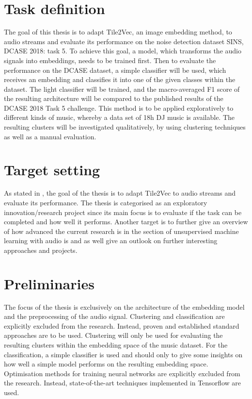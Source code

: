 \section{Task definition}
\label{sub:Task-Definition}
The goal of this thesis is to adapt Tile2Vec, an image embedding method, to audio streams and evaluate its performance on the noise detection dataset \flqq SINS, DCASE 2018: task 5\frqq. 
\newline
\newline
To achieve this goal, a model, which transforms the audio signals into embeddings, needs to be trained first. Then to evaluate the performance on the DCASE dataset, a simple classifier will be used, which receives an embedding and classifies it into one of the given classes within the dataset. The light classifier will be trained, and the macro-averaged F1 score of the resulting architecture will be compared to the published results of the DCASE 2018 Task 5 challenge.
\newline
\newline
This method is to be applied exploratively to different kinds of music, whereby a data set of 18h DJ music is available. The resulting clusters will be investigated qualitatively, by using clustering techniques as well as a manual evaluation.

\section{Target setting}
\label{sub:Target-Setting}
As stated in , the goal of the thesis is to adapt Tile2Vec to audio streams and evaluate its performance. The thesis is categorised as an exploratory innovation/research project since its main focus is to evaluate if the task can be completed and how well it performs. Another target is to further give an overview of how advanced the current research is in the section of unsupervised machine learning with audio is and as well give an outlook on further interesting approaches and projects.

\section{Preliminaries}
\label{sub:Preliminaries}
The focus of the thesis is exclusively on the architecture of the embedding model and the preprocessing of the audio signal. Clustering and classification are explicitly excluded from the research. Instead, proven and established standard approaches are to be used.
\newline
\newline
Clustering will only be used for evaluating the resulting clusters within the embedding space of the music dataset. For the classification, a simple classifier is used and should only to give some insights on how well a simple model performs on the resulting embedding space. 
\newline
\newline
Optimisation methods for training neural networks are explicitly excluded from the research. Instead, state-of-the-art techniques implemented in Tensorflow are used.
